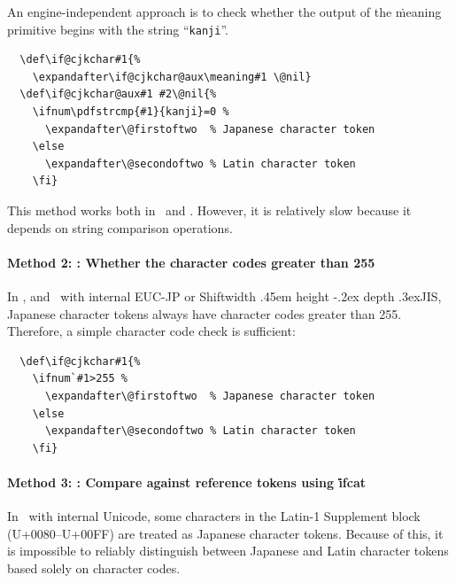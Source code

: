 \documentclass[a4paper,11pt,dvipdfmx]{article}
\def\_{\leavevmode\vrule width .45em height -.2ex depth .3ex\relax}
\begin{document}
An engine-independent approach is to check whether the output of
the \.{meaning} primitive begins with the string ``\texttt{kanji\textvisiblespace}''.
\begin{verbatim}
  \def\if@cjkchar#1{%
    \expandafter\if@cjkchar@aux\meaning#1 \@nil}
  \def\if@cjkchar@aux#1 #2\@nil{%
    \ifnum\pdfstrcmp{#1}{kanji}=0 %
      \expandafter\@firstoftwo  % Japanese character token
    \else
      \expandafter\@secondoftwo % Latin character token
    \fi}
\end{verbatim}
This method works both in \pTeX\ and \upTeX. However, it is relatively slow
because it depends on string comparison operations.

\paragraph{Method 2: \pTeX: Whether the character codes greater than 255}

In \pTeX, and \upTeX\ with internal EUC-JP or Shift\_JIS,
Japanese character tokens always have character codes greater than 255.
Therefore, a simple character code check is sufficient:
\begin{verbatim}
  \def\if@cjkchar#1{%
    \ifnum`#1>255 %
      \expandafter\@firstoftwo  % Japanese character token
    \else
      \expandafter\@secondoftwo % Latin character token
    \fi}
\end{verbatim}

\paragraph{Method 3: \upTeX: Compare against reference tokens using \.{ifcat}}

In \upTeX\ with internal Unicode, some characters in the Latin-1 Supplement
block (U+0080--U+00FF) are treated as Japanese character tokens.
Because of this, it is impossible to reliably distinguish between Japanese and
Latin character tokens based solely on character codes.
\end{document}
